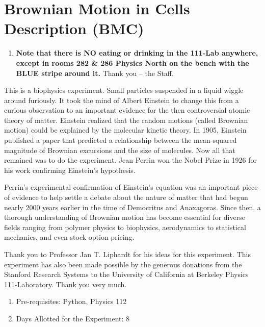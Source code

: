 \documentclass{../lab}
\begin{document}
\maketitle

\tableofcontents

\section{Brownian Motion in Cells Description (BMC)}

\begin{enumerate}
    \item \textbf{Note that there is NO eating or drinking in the 111-Lab anywhere, except in rooms 282 \& 286 Physics North on the bench with the BLUE stripe around it.} Thank you -- the Staff.
\end{enumerate}

This is a biophysics experiment. Small particles suspended in a liquid wiggle around furiously. It took the mind of Albert Einstein to change this from a curious observation to an important evidence for the then controversial atomic theory of matter. Einstein realized that the random motions (called Brownian motion) could be explained by the molecular kinetic theory. In 1905, Einstein published a paper that predicted a relationship between the mean-squared magnitude of Brownian excursions and the size of molecules. Now all that remained was to do the experiment. Jean Perrin won the Nobel Prize in 1926 for his work confirming Einstein's hypothesis.

Perrin's experimental confirmation of Einstein's equation was an important piece of evidence to help settle a debate about the nature of matter that had begun nearly 2000 years earlier in the time of Democritus and Anaxagoras. Since then, a thorough understanding of Brownian motion has become essential for diverse fields ranging from polymer physics to biophysics, aerodynamics to statistical mechanics, and even stock option pricing.

Thank you to Professor Jan T. Liphardt for his ideas for this experiment. This experiment has also been made possible by the generous donations from the Stanford Research Systems to the University of California at Berkeley Physics 111-Laboratory. Thank you very much.

\begin{enumerate}
    \item Pre-requisites: Python, Physics 112

    \item Days Allotted for the Experiment: 8
\end{enumerate}
\end{document}
